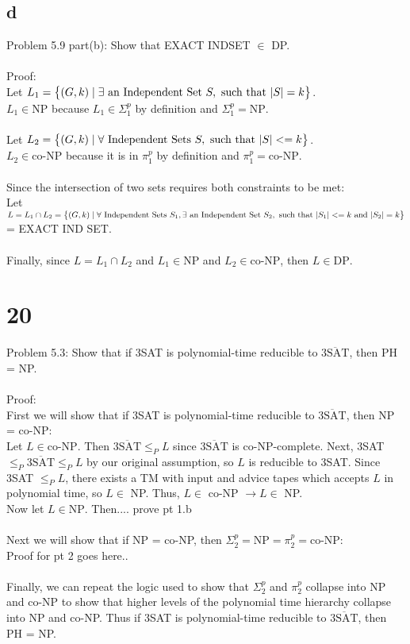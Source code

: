 \documentclass[letterpaper,notitlepage,twoside]{article}
\begin{document}
\subsection*{d}
Problem 5.9 part(b): Show that EXACT INDSET $\in $ DP.
\\\\
Proof:\\
Let $L_1 = \left\{ \left( G, k \right) \mid \exists \text{ an Independent Set } S, \text{ such that } \abs{S} = k \right\}$.\\
$L_1 \in \text{NP}$ because $L_1 \in \Sigma_1^p$ by definition and $\Sigma_1^p = \text{NP}$.
\\\\
Let $L_2 = \left\{ \left( G, k \right) \mid \forall \text{ Independent Sets } S, \text{ such that } \abs{S} <= k \right\}$.\\
$L_2 \in \text{co-NP}$ because it is in $\pi_1^p$ by definition and $\pi_1^p = \text{co-NP}$.
\\\\
Since the intersection of two sets requires both constraints to be met:\\
Let $L = L_1 \cap L_2 = \left\{ \left( G, k \right) \mid \forall \text{ Independent Sets } S_1, \exists \text{ an Independent Set } S_2, \text{ such that } \abs{S_1} <= k \text{ and } \abs{S_2} = k \right\}$ = EXACT IND SET.\\\\
Finally, since $L = L_1 \cap L_2$ and $L_1 \in \text{NP}$ and $L_2 \in \text{co-NP}$, then $L \in \text{DP}$.

\section*{20}
Problem 5.3: Show that if 3SAT is polynomial-time reducible to $\overline{\text{3SAT}}$, then PH = NP.
\\\\
Proof:\\
First we will show that if 3SAT is polynomial-time reducible to $\overline{\text{3SAT}}$, then NP = co-NP:\\
Let $L \in \text{co-NP}$. Then $\overline{\text{3SAT}} \le_P L$ since $\overline{\text{3SAT}}$ is co-NP-complete. Next, 3SAT $\le_P \overline{\text{3SAT}} \le_P L$ by our original assumption, so $L$ is reducible to 3SAT. Since 3SAT $\le_P L$, there exists a TM with input and advice tapes which accepts $L$ in polynomial time, so $L \in$ NP. Thus, $L \in$ co-NP $\rightarrow L \in$ NP.\\
Now let $L \in \text{NP}$. Then.... prove pt 1.b
\\\\
Next we will show that if NP = co-NP, then $\Sigma_2^p = \text{NP} = \pi_2^p = \text{co-NP}$:\\
Proof for pt 2 goes here..
\\\\
Finally, we can repeat the logic used to show that $\Sigma_2^p$ and $\pi_2^p$ collapse into NP and co-NP to show that higher levels of the polynomial time hierarchy collapse into NP and co-NP. Thus if 3SAT is polynomial-time reducible to $\overline{\text{3SAT}}$, then PH = NP.
\end{document}
